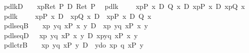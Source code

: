 \begin{isabellebody}
\ \ pdl{\isacharunderscore}k{}D{\isacharcolon}\ \ \ {\isachardoublequote}{\isasymturnstile}\ {\isasymlangle}x{\isasymleftarrow}p{\isasymrangle}{\isacharparenleft}Ret\ P{\isacharparenright}\ {\isasymlongrightarrow}\isactrlsub D\ Ret\ P{\isachardoublequote}\isanewline
\ \ pdl{\isacharunderscore}k{}{\isacharcolon}\ \ \ \ {\isachardoublequote}{\isasymturnstile}\ {\isasymlangle}x{\isasymleftarrow}p{\isasymrangle}{\isacharparenleft}P\ x\ {\isasymor}\isactrlsub D\ Q\ x{\isacharparenright}\ {\isasymlongrightarrow}\isactrlsub D\ {\isacharparenleft}{\isasymlangle}x{\isasymleftarrow}p{\isasymrangle}{\isacharparenleft}P\ x{\isacharparenright}\ {\isasymor}\isactrlsub D\ {\isasymlangle}x{\isasymleftarrow}p{\isasymrangle}{\isacharparenleft}Q\ x{\isacharparenright}{\isacharparenright}{\isachardoublequote}\isanewline
\ \ pdl{\isacharunderscore}k{}{\isacharcolon}\ \ \ \ {\isachardoublequote}{\isasymturnstile}\ {\isacharparenleft}{\isasymlangle}x{\isasymleftarrow}p{\isasymrangle}{\isacharparenleft}P\ x{\isacharparenright}\ {\isasymlongrightarrow}\isactrlsub D\ {\isacharbrackleft}{\isacharhash}\ x{\isasymleftarrow}p{\isacharbrackright}{\isacharparenleft}Q\ x{\isacharparenright}{\isacharparenright}\ {\isasymlongrightarrow}\isactrlsub D\ {\isacharbrackleft}{\isacharhash}\ x{\isasymleftarrow}p{\isacharbrackright}{\isacharparenleft}P\ x\ {\isasymlongrightarrow}\isactrlsub D\ Q\ x{\isacharparenright}{\isachardoublequote}\isanewline
\ \ pdl{\isacharunderscore}seqB{\isacharcolon}\ \ {\isachardoublequote}{\isasymturnstile}\ {\isacharbrackleft}{\isacharhash}\ x{\isasymleftarrow}p{\isacharsemicolon}\ y{\isasymleftarrow}q\ x{\isacharbrackright}{\isacharparenleft}P\ x\ y{\isacharparenright}\ {\isasymlongleftrightarrow}\isactrlsub D\ {\isacharbrackleft}{\isacharhash}\ x{\isasymleftarrow}p{\isacharbrackright}{\isacharbrackleft}{\isacharhash}\ y{\isasymleftarrow}q\ x{\isacharbrackright}{\isacharparenleft}P\ x\ y{\isacharparenright}{\isachardoublequote}\isanewline
\ \ pdl{\isacharunderscore}seqD{\isacharcolon}\ \ {\isachardoublequote}{\isasymturnstile}\ {\isasymlangle}x{\isasymleftarrow}p{\isacharsemicolon}\ y{\isasymleftarrow}q\ x{\isasymrangle}{\isacharparenleft}P\ x\ y{\isacharparenright}\ {\isasymlongleftrightarrow}\isactrlsub D\ {\isasymlangle}x{\isasymleftarrow}p{\isasymrangle}{\isasymlangle}y{\isasymleftarrow}q\ x{\isasymrangle}{\isacharparenleft}P\ x\ y{\isacharparenright}{\isachardoublequote}\isanewline
\ \ pdl{\isacharunderscore}ctrB{\isacharcolon}\ \ {\isachardoublequote}{\isasymturnstile}\ {\isacharbrackleft}{\isacharhash}\ x{\isasymleftarrow}p{\isacharsemicolon}\ y{\isasymleftarrow}q\ x{\isacharbrackright}{\isacharparenleft}P\ y{\isacharparenright}\ {\isasymlongrightarrow}\isactrlsub D\ {\isacharbrackleft}{\isacharhash}\ y{\isasymleftarrow}do\ {\isacharbraceleft}x{\isasymleftarrow}p{\isacharsemicolon}\ q\ x{\isacharbraceright}{\isacharbrackright}{\isacharparenleft}P\ y{\isacharparenright}{\isachardoublequote}\isanewline

\end{isabellebody}
